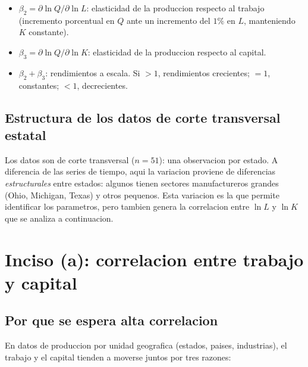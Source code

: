 \documentclass[12pt, letterpaper]{article}
\theoremstyle{remark}
\begin{document}
\begin{itemize}[leftmargin=1.6em, itemsep=4pt]
  \item $\beta_2 = \partial \ln Q / \partial \ln L$: elasticidad de la produccion
    respecto al trabajo (incremento porcentual en $Q$ ante un incremento del
    $1\%$ en $L$, manteniendo $K$ constante).
  \item $\beta_3 = \partial \ln Q / \partial \ln K$: elasticidad de la produccion
    respecto al capital.
  \item $\beta_2 + \beta_3$: rendimientos a escala. Si $> 1$, rendimientos
    crecientes; $= 1$, constantes; $< 1$, decrecientes.
\end{itemize}

\subsection{Estructura de los datos de corte transversal estatal}

Los datos son de corte transversal ($n = 51$): una observacion por estado.
A diferencia de las series de tiempo, aqui la variacion proviene de diferencias
\emph{estructurales} entre estados: algunos tienen sectores manufactureros
grandes (Ohio, Michigan, Texas) y otros pequenos. Esta variacion es la que
permite identificar los parametros, pero tambien genera la correlacion entre
$\ln L$ y $\ln K$ que se analiza a continuacion.

\section{Inciso (a): correlacion entre trabajo y capital}

\subsection{Por que se espera alta correlacion}

En datos de produccion por unidad geografica (estados, paises, industrias),
el trabajo y el capital tienden a moverse juntos por tres razones:
\end{document}
